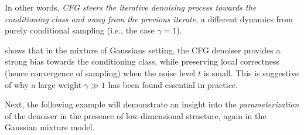 \documentclass[../../book-main.tex]{subfiles}
\begin{document}
\begin{example}
\begin{enumerate}
            In other words, \textit{CFG steers the iterative denoising
                process towards the conditioning class and away from
                the previous
            iterate}, a different dynamics from purely conditional sampling
            (i.e., the case $\gamma = 1$).
    \end{enumerate}
\end{example}

 shows that in the mixture of
Gaussians setting, the CFG denoiser provides a strong bias towards the
conditioning class, while preserving local correctness (hence convergence of
sampling) when the noise level $t$ is small.
This is suggestive of why a large weight $\gamma \gg 1$ has been found essential
in practice.

Next, the following example will demonstrate an insight into the
\textit{parameterization} of the denoiser in the presence of
low-dimensional structure, again in the Gaussian mixture model.
\end{document}

